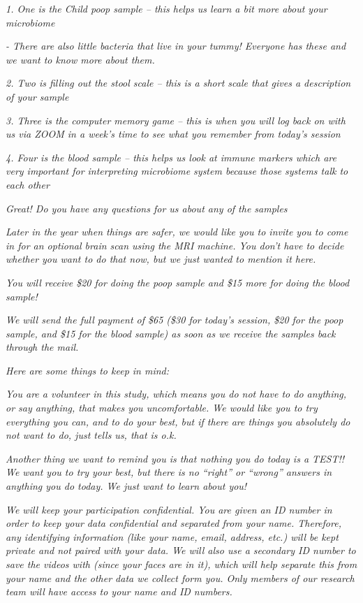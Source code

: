 \documentclass[
]{book}
\begin{document}
\emph{1. One is the Child poop sample -- this helps us learn a bit more about your microbiome}

\emph{- There are also little bacteria that live in your tummy! Everyone has these and we want to know more about them.}

\emph{2. Two is filling out the stool scale -- this is a short scale that gives a description of your sample}

\emph{3. Three is the computer memory game -- this is when you will log back on with us via ZOOM in a week's time to see what you remember from today's session}

\emph{4. Four is the blood sample -- this helps us look at immune markers which are very important for interpreting microbiome system because those systems talk to each other}

\emph{Great! Do you have any questions for us about any of the samples}

\emph{Later in the year when things are safer, we would like you to invite you to come in for an optional brain scan using the MRI machine. You don't have to decide whether you want to do that now, but we just wanted to mention it here.}

\emph{You will receive \$20 for doing the poop sample and \$15 more for doing the blood sample!}

\emph{We will send the full payment of \$65 (\$30 for today's session, \$20 for the poop sample, and \$15 for the blood sample) as soon as we receive the samples back through the mail.}

\emph{Here are some things to keep in mind:}

\emph{You are a volunteer in this study, which means you do not have to do anything, or say anything, that makes you uncomfortable. We would like you to try everything you can, and to do your best, but if there are things you absolutely do not want to do, just tells us, that is o.k.}

\emph{Another thing we want to remind you is that nothing you do today is a TEST!! We want you to try your best, but there is no ``right'' or ``wrong'' answers in anything you do today. We just want to learn about you!}

\emph{We will keep your participation confidential. You are given an ID number in order to keep your data confidential and separated from your name. Therefore, any identifying information (like your name, email, address, etc.) will be kept private and not paired with your data. We will also use a secondary ID number to save the videos with (since your faces are in it), which will help separate this from your name and the other data we collect form you. Only members of our research team will have access to your name and ID numbers.}
\end{document}
